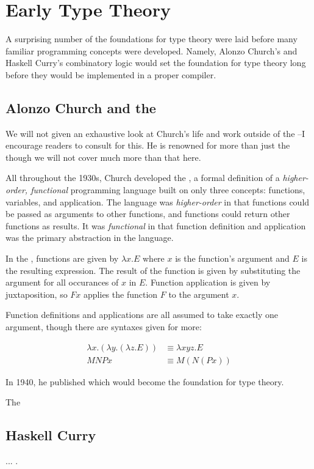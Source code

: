 \section{Early Type Theory}

A surprising number of the foundations for type theory were laid before
many familiar programming concepts were developed.
Namely, Alonzo Church's \lambdacalc{} and Haskell Curry's combinatory logic
would set the foundation for type theory long before they would be implemented in
a proper compiler.

\subsection{Alonzo Church and the \Lambdacalc{}}

We will not given an exhaustive look at Church's life and work outside of the
\lambdacalc{}--I encourage readers to consult 
for this.
He is renowned for more than just the \lambdacalc{} though we will not cover much more
than that here.

All throughout the 1930s, Church developed the \textit{\lambdacalc{}},
a formal definition of a \textit{higher-order, functional} programming language
built on only three concepts: functions, variables, and application.
The language was \textit{higher-order} in that functions could be passed
as arguments to other functions, and functions could return other functions as results.
It was \textit{functional} in that function definition and application was the
primary abstraction in the language.

In the \lambdacalc{}, functions are given by $\lambda x. E$ where $x$ is the function's argument
and $E$ is the resulting expression. The result of the function is given by substituting the
argument for all occurances of $x$ in $E$. Function application is given by juxtaposition,
so $F x$ applies the function $F$ to the argument $x$.

Function definitions and applications are all assumed to take exactly one argument,
though there are syntaxes given for more:

\begin{align}
	\lambda x . (\lambda y . (\lambda z . E)) & \equiv \lambda x y z . E
	\tag{function definition}
	\\
	M N P x                                   & \equiv M (N (P x))
	\tag{function application}
\end{align}

In 1940, he published 
which would become the foundation for type theory.

The \lambdacalc{}

\subsection{Haskell Curry}

...
.
